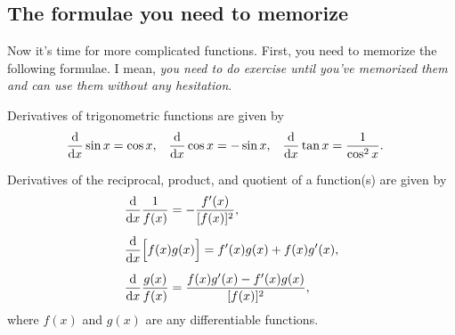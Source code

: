 \documentclass[11pt,pdfa,lastpage]{MishoNote}
\newif\ifBasicForm\BasicFormtrue
\begin{document}
\ifBasicForm\pagebreak\else\fi

\subsection{The formulae you need to memorize}
Now it's time for more complicated functions. First, you need to memorize the following formulae.
I mean, \emph{you need to do exercise until you've memorized them and can use them without any hesitation}.

\begin{theorem}{}{}
  Derivatives of trigonometric functions are given by
  \begin{align}
   \diff{}{x}\sin x &= \cos x,&
   \diff{}{x}\cos x &= -\sin x,&
   \diff{}{x}\tan x &= \frac1{\cos^2x}.\label{eq:trig}
  \end{align}
\end{theorem}
\begin{theorem}{}{}
  Derivatives of the reciprocal, product, and quotient of a function(s) are given by
  \begin{align}
   &\label{eq:reci} \diff{}{x}\frac{1}{f(x)}=-\frac{f'(x)}{[f(x)]^2},\\[0.5em]
   &\label{eq:prod} \diff{}{x}\Bigl[f(x)g(x)\Bigr]=f'(x)g(x)+f(x)g'(x),\\[0.5em]
   &\label{eq:quot} \diff{}{x}\frac{g(x)}{f(x)}=\frac{f(x)g'(x)-f'(x)g(x)}{[f(x)]^2},
   \end{align}
   where  $f(x)$ and $g(x)$ are any differentiable functions.
\end{theorem}
\end{document}
